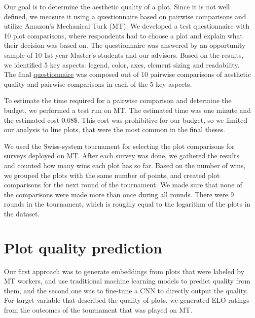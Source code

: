 \documentclass[fleqn,moreauthors,10pt]{ds_report}
\begin{document}
Our goal is to determine the aesthetic quality of a plot. Since it is not well defined, we measure it using a questionnaire based on pairwise comparisons and utilize Amazon's Mechanical Turk (MT). We developed a test questionnaire with 10 plot comparisons, where respondents had to choose a plot and explain what their decision was based on. The questionnaire was answered by an opportunity sample of 10 1st year Master's students and our advisors. Based on the results, we identified 5 key aspects: legend, color, axes, element sizing and readability. The final \href{https://github.com/AndrejHafner/how-good-is-my-plot/blob/master/src/figures/questionnaire.png}{questionnaire} was composed out of 10 pairwise comparisons of aesthetic quality and pairwise comparisons in each of the 5 key aspects.

To estimate the time required for a pairwise comparison and determine the budget, we performed a test run on MT. The estimated time was one minute and the estimated cost 0.08\$. This cost was prohibitive for our budget, so we limited our analysis to line plots, that were the most common in the final theses.

We used the Swiss-system tournament for selecting the plot comparisons for surveys deployed on MT. After each survey was done, we gathered the results and counted how many wins each plot has so far. Based on the number of wins, we grouped the plots with the same number of points, and created plot comparisons for the next round of the tournament. We made sure that none of the comparisons were made more than once during all rounds. There were 9 rounds in the tournament, which is roughly equal to the logarithm of the plots in the dataset.

\section*{Plot quality prediction}
Our first approach was to generate embeddings from plots that were labeled by MT workers, and use traditional machine learning models to predict quality from them, and the second one was to fine-tune a CNN to directly output the quality. For target variable that described the quality of plots, we generated ELO ratings from the outcomes of the tournament that was played on MT.
\end{document}
